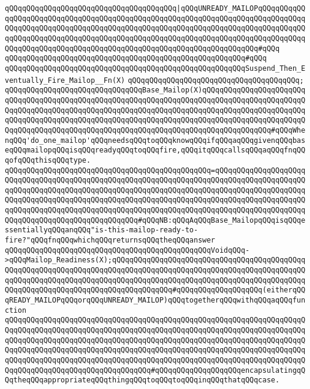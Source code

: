 \newline
\verb|qQQqqQQqqQQqqQQqqQQqqQQqqQQqqQQqqQQqqQQq|\verb#|qQQqUNREADY_MAILOPqQQqqQQqqQQqqQQqqQQqqQQqqQQqqQQqqQQqqQQqqQQqqQQqqQQqqQQqqQQqqQQqqQQqqQQqqQQqqQQqqQQqqQQqqQQqqQQqqQQqqQQqqQQqqQQqqQQqqQQqqQQqqQQqqQQqqQQqqQQqqQQqqQQqqQQqqQQqqQQqqQQqqQQqqQQqqQQqqQQqqQQqqQQqqQQqqQQqqQQqqQQqqQQqqQQqqQQqqQQqqQQqqQQqqQQqqQQqqQQqqQQqqQQqqQQqqQQqqQQqqQQqqQQqqQQqqQQqqQQq#\verb|#qQQq|\newline
\verb|qQQqqQQqqQQqqQQqqQQqqQQqqQQqqQQqqQQqqQQqqQQqqQQqqQQqqQQq#qQQq|\newline
\verb|qQQqqQQqqQQqqQQqqQQqqQQqqQQqqQQqqQQqqQQqqQQqqQQqqQQqqQQqSuspend_Then_Eventually_Fire_Mailop__Fn(X)|\newline
\verb|qQQqqQQqqQQqqQQqqQQqqQQqqQQqqQQqqQQqqQQq;|\newline
\newline
\verb|qQQqqQQqqQQqqQQqqQQqqQQqqQQqqQQqBase_Mailop(X)qQQqqQQqqQQqqQQqqQQqqQQqqQQqqQQqqQQqqQQqqQQqqQQqqQQqqQQqqQQqqQQqqQQqqQQqqQQqqQQqqQQqqQQqqQQqqQQqqQQqqQQqqQQqqQQqqQQqqQQqqQQqqQQqqQQqqQQqqQQqqQQqqQQqqQQqqQQqqQQqqQQqqQQqqQQqqQQqqQQqqQQqqQQqqQQqqQQqqQQqqQQqqQQqqQQqqQQqqQQqqQQqqQQqqQQqqQQqqQQqqQQqqQQqqQQqqQQqqQQqqQQqqQQqqQQqqQQqqQQqqQQqqQQqqQQqqQQq#qQQqWhenqQQq'do_one_mailop'qQQqneedsqQQqtoqQQqknowqQQqifqQQqaqQQqgivenqQQqbaseqQQqmailopqQQqisqQQqreadyqQQqtoqQQqfire,qQQqitqQQqcallsqQQqaqQQqfnqQQqofqQQqthisqQQqtype.|\newline
\verb|qQQqqQQqqQQqqQQqqQQqqQQqqQQqqQQqqQQqqQQqqQQqqQQq=qQQqqQQqqQQqqQQqqQQqqQQqqQQqqQQqqQQqqQQqqQQqqQQqqQQqqQQqqQQqqQQqqQQqqQQqqQQqqQQqqQQqqQQqqQQqqQQqqQQqqQQqqQQqqQQqqQQqqQQqqQQqqQQqqQQqqQQqqQQqqQQqqQQqqQQqqQQqqQQqqQQqqQQqqQQqqQQqqQQqqQQqqQQqqQQqqQQqqQQqqQQqqQQqqQQqqQQqqQQqqQQqqQQqqQQqqQQqqQQqqQQqqQQqqQQqqQQqqQQqqQQqqQQqqQQqqQQqqQQqqQQqqQQqqQQqqQQqqQQqqQQqqQQqqQQqqQQqqQQqqQQqqQQqqQQq#qQQqNB:qQQqAqQQqBase_MailopqQQqisqQQqessentiallyqQQqanqQQq"is-this-mailop-ready-to-fire?"qQQqfnqQQqwhichqQQqreturnsqQQqtheqQQqanswer|\newline
\verb|qQQqqQQqqQQqqQQqqQQqqQQqqQQqqQQqqQQqqQQqqQQqqQQqVoidqQQq->qQQqMailop_Readiness(X);qQQqqQQqqQQqqQQqqQQqqQQqqQQqqQQqqQQqqQQqqQQqqQQqqQQqqQQqqQQqqQQqqQQqqQQqqQQqqQQqqQQqqQQqqQQqqQQqqQQqqQQqqQQqqQQqqQQqqQQqqQQqqQQqqQQqqQQqqQQqqQQqqQQqqQQqqQQqqQQqqQQqqQQqqQQqqQQqqQQqqQQqqQQqqQQqqQQqqQQqqQQqqQQqqQQqqQQqqQQqqQQq#qQQqqQQqqQQqqQQqqQQq(eitherqQQqREADY_MAILOPqQQqorqQQqUNREADY_MAILOP)qQQqtogetherqQQqwithqQQqaqQQqfunction|\newline
\verb|qQQqqQQqqQQqqQQqqQQqqQQqqQQqqQQqqQQqqQQqqQQqqQQqqQQqqQQqqQQqqQQqqQQqqQQqqQQqqQQqqQQqqQQqqQQqqQQqqQQqqQQqqQQqqQQqqQQqqQQqqQQqqQQqqQQqqQQqqQQqqQQqqQQqqQQqqQQqqQQqqQQqqQQqqQQqqQQqqQQqqQQqqQQqqQQqqQQqqQQqqQQqqQQqqQQqqQQqqQQqqQQqqQQqqQQqqQQqqQQqqQQqqQQqqQQqqQQqqQQqqQQqqQQqqQQqqQQqqQQqqQQqqQQqqQQqqQQqqQQqqQQqqQQqqQQqqQQqqQQqqQQqqQQqqQQqqQQqqQQqqQQqqQQqqQQqqQQqqQQqqQQqqQQqqQQqqQQqqQQqqQQq#qQQqqQQqqQQqqQQqqQQqencapsulatingqQQqtheqQQqappropriateqQQqthingqQQqtoqQQqtoqQQqinqQQqthatqQQqcase.|\newline
